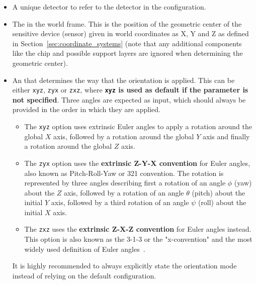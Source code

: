 \begin{itemize}
\item A unique detector  to refer to the detector in the configuration.
\item The  in the world frame.
This is the position of the geometric center of the sensitive device (sensor) given in world coordinates as X, Y and Z as defined in Section~\ref{sec:coordinate_systems} (note that any additional components like the chip and possible support layers are ignored when determining the geometric center).
\item An  that determines the way that the orientation is applied.
This can be either \texttt{xyz}, \texttt{zyx} or \texttt{zxz}, where \textbf{\texttt{xyz} is used as default if the parameter is not specified}. Three angles are expected as input, which should always be provided in the order in which they are applied.
\begin{itemize}
    \item The \texttt{xyz} option uses extrinsic Euler angles to apply a rotation around the global $X$ axis, followed by a rotation around the global $Y$ axis and finally a rotation around the global $Z$ axis.
    \item The \texttt{zyx} option uses the \textbf{extrinsic Z-Y-X convention} for Euler angles, also known as Pitch-Roll-Yaw or 321 convention. The rotation is represented by three angles describing first a rotation of an angle $\phi$ (yaw) about the $Z$ axis, followed by a rotation of an angle $\theta$ (pitch) about the initial $Y$ axis, followed by a third rotation of an angle $\psi$ (roll) about the initial $X$ axis.
    \item The \texttt{zxz} uses the \textbf{extrinsic Z-X-Z convention} for Euler angles instead. This option is also known as the 3-1-3 or the "x-convention" and the most widely used definition of Euler angles~\cite{eulerangles}.
\end{itemize}
\begin{warning}
It is highly recommended to always explicitly state the orientation mode instead of relying on the default configuration.
\end{warning}


\end{itemize}
